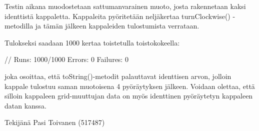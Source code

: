Testin aikana muodostetaan sattumanvarainen muoto, josta rakennetaan kaksi
identtistä kappaletta. Kappaleita pyöritetään neljäkertaa turnClockwise()
-metodilla ja tämän jälkeen kappaleiden tulostumista verrataan.

Tulokseksi saadaan 1000 kertaa toistetulla toistokokeella:

\begin{javacode}
// Runs: 1000/1000	Errors: 0	Failures:	0
\end{javacode}

joka osoittaa, että toString()-metodit palauttavat identtisen arvon, jolloin
kappale tulostuu saman muotoisena 4 pyöräytyksen jälkeen. Voidaan olettaa, että
silloin kappaleen grid-muuttujan data on myös identtinen pyöräytetyn kappaleen
datan kanssa. 

Tekijänä Pasi Toivanen (517487)


